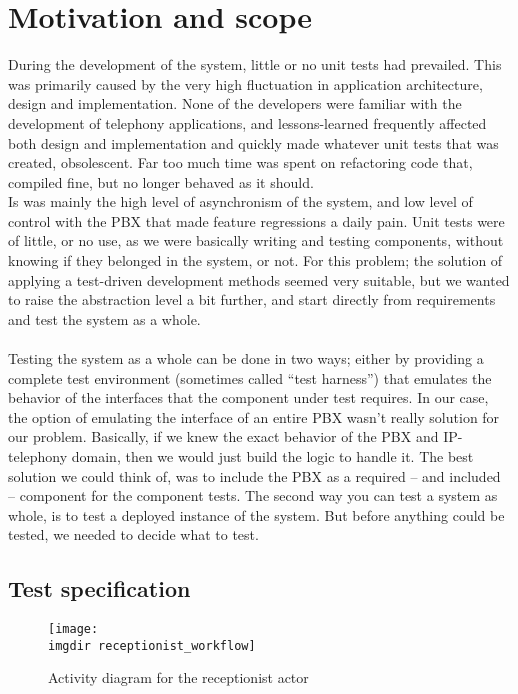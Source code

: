 \section{Motivation and scope}
During the development of the system, little or no unit tests had prevailed. This  was primarily caused by the very high fluctuation in application architecture, design and implementation. None of the developers were familiar with the development of telephony applications, and lessons-learned frequently affected both design and implementation and quickly made whatever unit tests that was created, obsolescent. Far too much time was spent on refactoring code that, compiled fine, but no longer behaved as it should.\\
Is was mainly the high level of asynchronism of the system, and low level of control with the PBX that made feature regressions a daily pain. Unit tests were of little, or no use, as we were basically writing and testing components, without knowing if they belonged in the system, or not. For this problem; the solution of applying a test-driven development methods seemed very suitable, but we wanted to raise the abstraction level a bit further, and start directly from requirements and test the system as a whole.\\\\
Testing the system as a whole can be done in two ways; either by providing a complete test environment (sometimes called ``test harness'') that emulates the behavior of the interfaces that the component under test requires. In our case, the option of emulating the interface of an entire PBX wasn't really solution for our problem. Basically, if we knew the exact behavior of the PBX and IP-telephony domain, then we would just build the logic to handle it. The best solution we could think of, was to include the PBX as a required -- and included -- component for the component tests.
The second way you can test a system as whole, is to test a deployed instance of the system. But before anything could be tested, we needed to decide what to test.

\subsection{Test specification}
\label{sec:1st-iteration-test-specification}
\begin{figure}[h]
\texttt{[image: \\imgdir receptionist\_workflow]}
\centering
\caption{Activity diagram for the receptionist actor}
\label{fig:activity_diagram_receptionist}
\end{figure}

